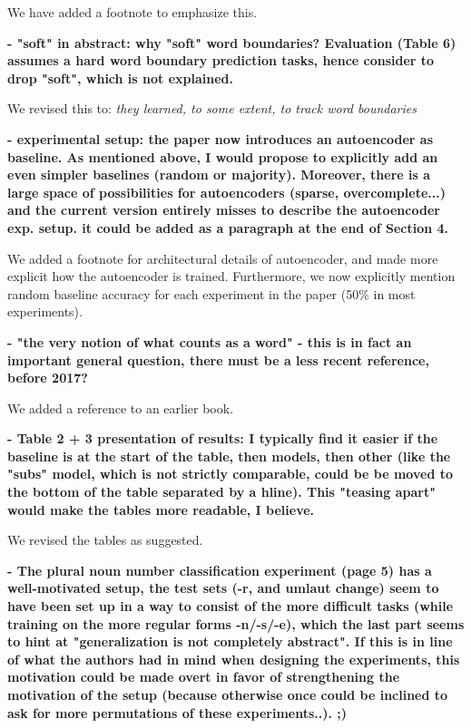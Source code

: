 \documentclass{article}[11pt,a4paper,oneside]
\begin{document}
We have added a footnote to emphasize this.\newline

\textbf{
- "soft" in abstract: why "soft" word boundaries? Evaluation (Table 6)
assumes a hard word boundary prediction tasks, hence consider to drop
"soft", which is not explained.}

We revised this to: \textit{they learned, to some extent, to track word boundaries}\newline

\textbf{
- experimental setup: the paper now introduces an autoencoder as baseline.
As mentioned above, I would propose to explicitly add an even simpler
baselines (random or majority). Moreover, there is a large space of
possibilities for autoencoders (sparse, overcomplete...) and the current
version entirely misses to describe the autoencoder exp. setup. it could be
added as a paragraph at the end of Section 4.}

We added a footnote for architectural details of autoencoder, and made more explicit how the autoencoder is trained. Furthermore, we now explicitly mention random baseline accuracy for each experiment in the paper (50\% in most experiments).\newline

\textbf{
- "the very notion of what counts as a word" - this is in fact an important
general question, there must be a less recent reference, before 2017?}

We added a reference to an earlier book.\newline

\textbf{
- Table 2 + 3 presentation of results: I typically find it easier if the
baseline is at the start of the table, then models, then other (like the
"subs" model, which is not strictly comparable, could be be moved to the
bottom of the table separated by a hline). This "teasing apart" would make
the tables more readable, I believe.}

We revised the tables as suggested.\newline

\textbf{
- The plural noun number classification experiment (page 5) has a
well-motivated setup, the test sets (-r, and umlaut change) seem to have
been set up in a way to consist of the more difficult tasks (while training
on the more regular forms -n/-s/-e), which the last part seems to hint at
"generalization is not completely abstract". If this is in line of what the
authors had in mind when designing the experiments, this motivation could be
made overt in favor of strengthening the motivation of the setup (because
otherwise once could be inclined to ask for more permutations of these
experiments..). ;)}
\end{document}
